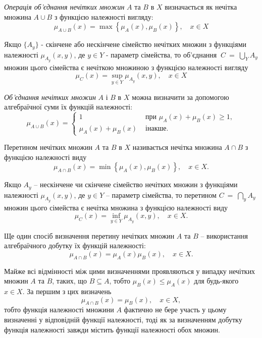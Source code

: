 \documentclass[14pt, a4paper, oneside]{extarticle}
\numberwithin{equation}{section}
\begin{document}
\textit{Операція об'єднання нечітких множин} $A$ та $B$ в $X$ визначається як нечітка множина $A \cup B$ з функцією належності вигляду:
\begin{equation}
\mu_{A \cup B}(x)=\max \left\{\mu_A(x), \mu_B(x)\right\}, \quad x \in X
\end{equation}

Якщо $\{A_y\}$ - скінчене або нескінчене сімейство нечітких множин з функціями належності $\mu_{A_y}(x, y)$, де $y \in Y$ - параметр сімейства, то об'єднання $~C~=~\bigcup_Y A_y$ множин цього сімейства є нечіткою множиною з функцією належності вигляду
\begin{equation}
\mu_C(x)=\sup _{y \in Y} \mu_{A_y}(x, y), \quad x \in X
\end{equation}

\textit{Об'єднання нечітких множин} $A$ і $B$ в $X$ можна визначити за допомогою алгебраїчної суми їх функцій належності:
\begin{equation}
\mu_{A \cup B}(x)=\left\{\begin{array}{cc}
1 & \text { при } \mu_A(x)+\mu_B(x) \geq 1, \\
\mu_A(x)+\mu_B(x) & \text { інакше. }
\end{array}\right.
\end{equation}

Перетином нечітких множин $A$ та $B$ в $X$ називається нечітка множина $A \cap B$ з функцією належності виду
\begin{equation}
\mu_{A \cap B}(x)=\min \left\{\mu_A(x), \mu_B(x)\right\}, \quad x \in X .
\end{equation}

Якщо ${A_y}$ -- нескінчене чи скінчене сімейство нечітких множин з функціями належності $\mu_{A_y}(x, y)$, де $y \in Y$ -- параметр сімейства, то перетином $C~=~\bigcap_{y} A_y$ множин цього сімейства є нечітка множина з функцією належності виду
\begin{equation}
\mu_C(x)=\inf _{y \in Y} \mu_{A_y}(x, y), \quad x \in X .
\end{equation}

Ще один спосіб визначення перетину нечітких множин $A$ та $B$ -- використання алгебраїчного добутку їх функцій належності:
\begin{equation}
\mu_{A \cap B}(x)=\mu_A(x) \mu_B(x), \quad x \in X.
\end{equation}

Майже всі відмінності між цими визначеннями проявляються у випадку нечітких множин $A$ та $B$, таких, що $B \subseteq A$, тобто $\mu_B(x) \leq \mu_A(x)$ для будь-якого $x \in X$. За першим з цих визначень
\begin{equation}
\mu_{A \cap B}(x)=\mu_B(x), \quad x \in X,
\end{equation}
тобто функція належності множини $A$ фактично не бере участь у цьому визначенні у відповідній функції належності, тоді як за визначенням добутку функція належності завжди містить функції належності обох множин.
\end{document}
